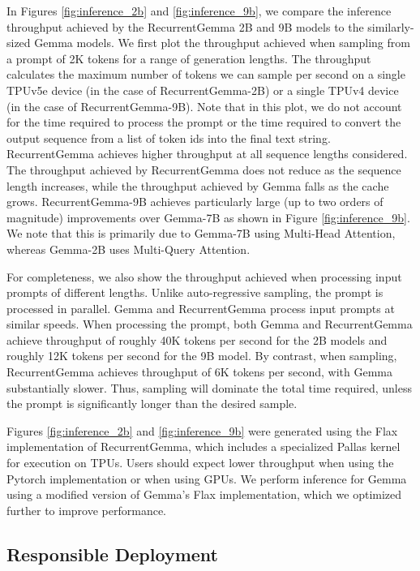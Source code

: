 \documentclass[9pt, a4paper, logo, twocolumn, copyright, nonumbering]{googledeepmind}
\begin{document}
In Figures \ref{fig:inference_2b} and \ref{fig:inference_9b}, we compare the inference throughput achieved by the RecurrentGemma 2B and 9B models to the similarly-sized Gemma models. We first plot the throughput achieved when sampling from a prompt of 2K tokens for a range of generation lengths. The throughput calculates the maximum number of tokens we can sample per second on a single TPUv5e device (in the case of RecurrentGemma-2B) or a single TPUv4 device (in the case of RecurrentGemma-9B). Note that in this plot, we do not account for the time required to process the prompt or the time required to convert the output sequence from a list of token ids into the final text string. RecurrentGemma achieves higher throughput at all sequence lengths considered. The throughput achieved by RecurrentGemma does not reduce as the sequence length increases, while the throughput achieved by Gemma falls as the cache grows. RecurrentGemma-9B achieves particularly large (up to two orders of magnitude) improvements over Gemma-7B as shown in Figure \ref{fig:inference_9b}. We note that this is primarily due to Gemma-7B using Multi-Head Attention, whereas Gemma-2B uses Multi-Query Attention.

For completeness, we also show the throughput achieved when processing input prompts of different lengths. Unlike auto-regressive sampling, the prompt is processed in parallel. Gemma and RecurrentGemma process input prompts at similar speeds. When processing the prompt, both Gemma and RecurrentGemma achieve throughput of roughly 40K tokens per second for the 2B models and roughly 12K tokens per second for the 9B model. By contrast, when sampling, RecurrentGemma achieves throughput of 6K tokens per second, with Gemma substantially slower. Thus, sampling will dominate the total time required, unless the prompt is significantly longer than the desired sample.

Figures \ref{fig:inference_2b} and \ref{fig:inference_9b} were generated using the Flax implementation of RecurrentGemma, which includes a specialized Pallas kernel for execution on TPUs. Users should expect lower throughput when using the Pytorch implementation or when using GPUs. We perform inference for Gemma using a modified version of Gemma's Flax implementation, which we optimized further to improve performance.

\subsection{Responsible Deployment}
\end{document}
